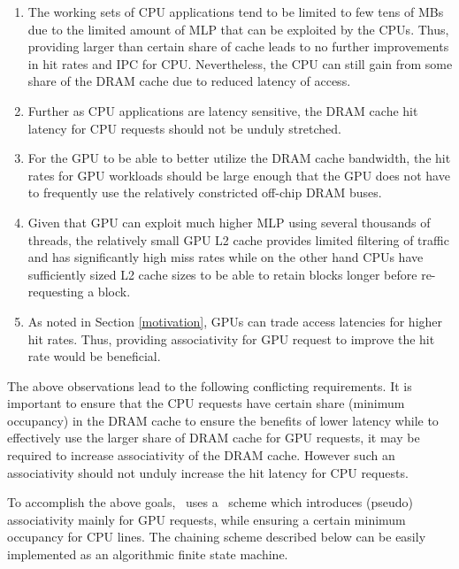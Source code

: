 \begin{enumerate}[label=(\roman*)]
	\item The working sets of CPU applications tend to be limited to few tens of MBs due to the limited amount of MLP that can be exploited by the CPUs. Thus, providing larger than certain share of cache leads to no further improvements in hit rates and IPC for CPU. Nevertheless, the CPU can still gain from some share of the DRAM cache due to reduced latency of access.
	\item Further as CPU applications are latency sensitive, the DRAM cache hit latency for CPU requests should not be unduly stretched.
	\item For the GPU to be able to better utilize the DRAM cache bandwidth, the hit rates for GPU workloads should be large enough that the GPU does not have to frequently use the relatively constricted off-chip DRAM buses.	
	\item Given that GPU can exploit much higher MLP using several thousands of threads, the relatively small GPU L2 cache provides limited filtering of traffic and has significantly high miss rates while on the other hand CPUs have sufficiently sized L2 cache sizes to be able to retain blocks longer before re-requesting a block.	
	\item As noted in Section \ref{motivation}, GPUs can trade access latencies for higher hit rates. Thus, providing associativity for GPU request to improve the hit rate would be beneficial.
\end{enumerate}

\par The above observations lead to the following conflicting requirements. It is important to ensure that the CPU requests have certain share (minimum occupancy) in the DRAM cache to ensure the benefits of lower latency while to effectively use the larger share of DRAM cache for GPU requests, it may be required to increase  associativity of the DRAM cache. However such an associativity should not unduly increase the hit latency for CPU requests. 
\par To accomplish the above goals, \cachename\ uses a \chaining\ scheme which introduces (pseudo) associativity mainly for GPU requests, while ensuring a certain minimum occupancy for CPU lines. The chaining scheme described below can be easily implemented as an algorithmic finite state machine.
